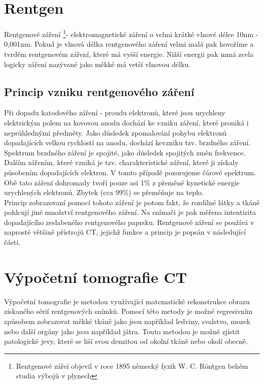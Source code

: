 \documentclass{thesis}%
\begin{document}
\section{Rentgen}
Rentgenové záření \footnote[1]{Rentgenové zářeí objevil v roce 1895 německý fyzik W. C. Röntgen behěm studia výbojů v plynech}- elektromagnetické záření o velmi krátké vlnové délce 10nm - 0,001nm. Pokud je vlnová délka rentgenového záření velmi malá pak hovoříme a tvrdém rentgenovém záření, které má vyšší energie. Nižší energii pak mmá zcela logicky záření nazývané jako měkké má vetší vlnovou délku.
\subsection{Princip vzniku rentgenového záření}
Při dopadu katodového záření - proudu elektronů, které jsou urychleny elektrickým polem na kovovou anodu dochází ke vzniku záření, které proniká i neprůhlednými předměty. Jako důsledek zpomalování pohybu elektronů dopadajících velkou rychlostí na anodu, dochází kevzniku tzv. brzdného záření. Spektrum brzdného záření je spojité, jako důsledek spojitých změn frekvence. Dalším zářením, které vzniká je tzv. charakteristické záření, které ji získaly působením dopadajících elektron. V tomto případě pozorujeme čárové spektrum. Obě tato záření dohromady tvoří pouze asi 1\% z přeměné kynetické energie urychlených elektronů. Zbytek (cca 99\%) se přeměňuje na teplo.\\
Princip zobrazovaní pomocí tohoto záření je potom fakt, že rozdílné látky a tkáně pohlcují jiné množství rentgenového záření. Na snímači je pak měřena intentizita dopadajícího zeslabeného rentgenového paprsku. Rentgenové záření se používá v naprosté většině přístrojů CT, jejichž funkce a princip je popsán v následující části.
\section{Výpočetní tomografie CT}
Výpočetní tomografie je metodou využívající matematické rekonstrukce obrazu získaného sérií rentgenových snímků. Pomocí této metody je možné regresivním způsobem zobrazovat měkké tkáně jako jsou například ledviny, svalstvo, mozek nebo další orgány jako jsou například játra. Touto metodou je možné zjistit patologické jevy, které se liší svou denzitou od okolní tkáně nebo okolí obecně.
\end{document}

